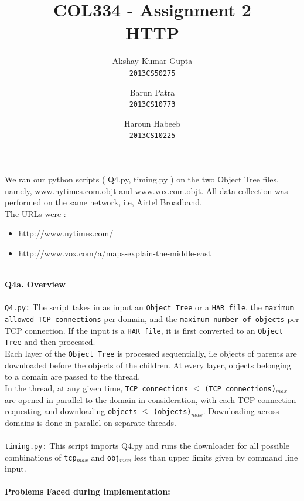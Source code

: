 \documentclass[12pt]{article}
\begin{document}
\title{COL334 - Assignment 2\\ HTTP}
\author{Akshay Kumar Gupta\\\texttt{2013CS50275} \and  Barun Patra\\\texttt{2013CS10773} \and Haroun Habeeb\\\texttt{2013CS10225}}
\date{}
\maketitle
\noindent 
We ran our python scripts ( Q4.py, timing.py ) on the two Object Tree files, namely, www.nytimes.com.objt and www.vox.com.objt. All data collection was performed on the same network, i.e, Airtel Broadband.\\
The URLs were : 
\begin{itemize}
\item http://www.nytimes.com/
\item http://www.vox.com/a/maps-explain-the-middle-east
\end{itemize}
~\\
{\bfseries Q4a. Overview} %
\\\\\texttt{Q4.py:} The script takes in as input an \texttt{Object Tree} or a \texttt{HAR file}, the \texttt{maximum allowed TCP connections} per domain, and the \texttt{maximum number of objects} per TCP connection. If the input is a \texttt{HAR file}, it is first converted to an \texttt{Object Tree} and then processed. \\
Each layer of the \texttt{Object Tree} is processed sequentially, i.e objects of parents are downloaded before the objects of the children. At every layer, objects belonging to a domain are passed to the thread.\\
In the thread, at any given time, \texttt{TCP connections} $\leq$ \texttt{(TCP connections)$_{max}$} are opened in parallel to the domain in consideration, with each TCP connection requesting and downloading \texttt{objects} $\leq$ \texttt{(objects)$_{max}$}. Downloading across domains is done in parallel on separate threads.
\\\\
\texttt{timing.py:} This script imports Q4.py and runs the downloader for all possible combinations of \texttt{tcp$_{max}$} and \texttt{obj$_{max}$} less than upper limits given by command line input.
~\\\\
\textbf{Problems Faced during implementation:}
\end{document}
